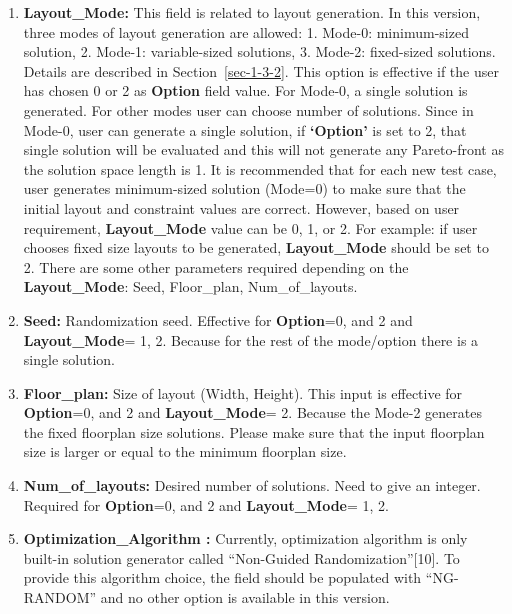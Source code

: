 \documentclass[11pt]{article}
\begin{document}
\begin{enumerate}
     \item \textbf{Layout\_Mode:}
     This field is related to layout generation. In this version, three modes of layout generation are allowed: 1. Mode-0: minimum-sized solution, 2. Mode-1: variable-sized solutions, 3. Mode-2: fixed-sized solutions. Details are described in Section~\ref{sec-1-3-2}. This option is effective if the user 
     has chosen 0 or 2 as \textbf{Option} field value. For Mode-0, a single solution is generated. For other modes user can choose number of solutions. Since in Mode-0, user can generate a single solution, if \textbf{`Option'} is set to 2, that single solution will be evaluated and this will not generate any Pareto-front as the solution space length is 1. It is recommended that for each new test case, user generates minimum-sized solution (Mode=0) to make sure that the initial layout and constraint values are correct. However, based on user requirement, \textbf{Layout\_Mode} value can be 0, 1, or 2. For example: if user chooses fixed size layouts to be generated, \textbf{Layout\_Mode} should be set to 2.
	 There are some other parameters required depending on the \textbf{Layout\_Mode}: Seed, Floor\_plan, Num\_of\_layouts.
	 
	 \item \textbf{Seed:}
	 Randomization seed. Effective for \textbf{Option}=0, and 2 and \textbf{Layout\_Mode}= 1, 2. Because for the rest of the mode/option there is a single solution.
	 
	 \item \textbf{Floor\_plan:}
	 Size of layout (Width, Height). This input is effective for \textbf{Option}=0, and 2 and \textbf{Layout\_Mode}= 2. Because the Mode-2 generates the fixed floorplan size solutions. Please make sure that the input floorplan size is larger or equal to the minimum floorplan size.
	 
	 \item \textbf{Num\_of\_layouts:}
	 Desired number of solutions. Need to give an integer. Required for \textbf{Option}=0, and 2 and \textbf{Layout\_Mode}= 1, 2.
	 
	 \item \textbf{Optimization\_Algorithm :}
	 Currently, optimization algorithm is only built-in solution generator called “Non-Guided Randomization”[10]. To provide this algorithm choice, the field should be populated with “NG-RANDOM” and no other option is available in this version.
	 
\end{enumerate}
\end{document}
